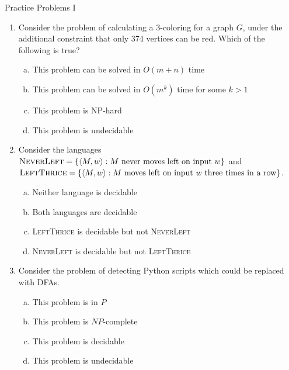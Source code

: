 \documentclass{beamer}
\begin{document}
\begin{frame}[t]{Practice Problems I}
    \begin{enumerate}
        \item Consider the problem of calculating a 3-coloring for a graph $G$, under the additional constraint that only 374 vertices can be red. Which of the following is true?
        \begin{enumerate}[(a)]
            \item This problem can be solved in $O(m + n)$ time
            \item This problem can be solved in $O(m^k)$ time for some $k > 1$
            \item This problem is NP-hard
            \item This problem is undecidable
        \end{enumerate}
        \pause\item Consider the languages $\textsc{NeverLeft}= \left\{\langle M, w \rangle: M \text{ never moves left on input } w\right\}$ and $\textsc{LeftThrice}= \left\{\langle M, w \rangle: M \text{ moves left on input } w \text{ three times in a row}\right\}$.
        \begin{enumerate}[(a)]
            \item Neither language is decidable
            \item Both languages are decidable
            \item \textsc{LeftThrice} is decidable but not \textsc{NeverLeft}
            \item \textsc{NeverLeft} is decidable but not \textsc{LeftThrice}
        \end{enumerate}
        \pause\item Consider the problem of detecting Python scripts which could be replaced with DFAs.
        \begin{enumerate}[(a)]
            \item This problem is in $P$
            \item This problem is $NP$-complete
            \item This problem is decidable
            \item This problem is undecidable
        \end{enumerate}
    \end{enumerate}
\end{frame}
\end{document}
